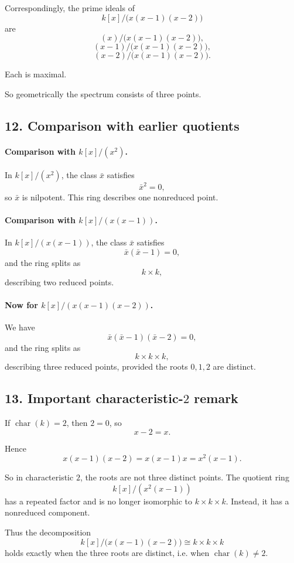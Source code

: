 \documentclass[12pt,a4paper]{article}
\theoremstyle{notespace}
\begin{document}
Correspondingly, the prime ideals of
\[
k[x]/\bigl(x(x-1)(x-2)\bigr)
\]
are
\[
(x)\big/\bigl(x(x-1)(x-2)\bigr),
\]
\[
(x-1)\big/\bigl(x(x-1)(x-2)\bigr),
\]
\[
(x-2)\big/\bigl(x(x-1)(x-2)\bigr).
\]

Each is maximal.

So geometrically the spectrum consists of three points.

\subsection{12. Comparison with earlier quotients}

\paragraph{Comparison with \(k[x]/(x^2)\).}
In \(k[x]/(x^2)\), the class \(\bar x\) satisfies
\[
\bar x^2=0,
\]
so \(\bar x\) is nilpotent. This ring describes one nonreduced point.

\paragraph{Comparison with \(k[x]/(x(x-1))\).}
In \(k[x]/(x(x-1))\), the class \(\bar x\) satisfies
\[
\bar x(\bar x-1)=0,
\]
and the ring splits as
\[
k\times k,
\]
describing two reduced points.

\paragraph{Now for \(k[x]/(x(x-1)(x-2))\).}
We have
\[
\bar x(\bar x-1)(\bar x-2)=0,
\]
and the ring splits as
\[
k\times k\times k,
\]
describing three reduced points, provided the roots \(0,1,2\) are distinct.

\subsection{13. Important characteristic-\(2\) remark}

If \(\operatorname{char}(k)=2\), then \(2=0\), so
\[
x-2=x.
\]

Hence
\[
x(x-1)(x-2)=x(x-1)x=x^2(x-1).
\]

So in characteristic \(2\), the roots are not three distinct points. The quotient ring
\[
k[x]/(x^2(x-1))
\]
has a repeated factor and is no longer isomorphic to \(k\times k\times k\). Instead, it has a nonreduced component.

Thus the decomposition
\[
k[x]/\bigl(x(x-1)(x-2)\bigr)\cong k\times k\times k
\]
holds exactly when the three roots are distinct, i.e. when \(\operatorname{char}(k)\neq 2\).
\end{document}
